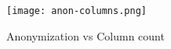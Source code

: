 \begin{figure}[H]
    \centering
    \texttt{[image: anon-columns.png]}
    \caption{Anonymization vs Column count}\label{fig:anon_columns}
\end{figure}